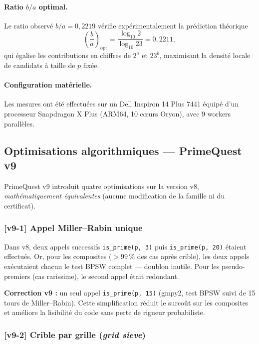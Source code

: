 \paragraph{Ratio $b/a$ optimal.}
Le ratio observé $b/a = 0{,}2219$ vérifie expérimentalement la prédiction théorique
\[
  \left(\frac{b}{a}\right)_{\!\text{opt}}
  = \frac{\log_{10} 2}{\log_{10} 23} = 0{,}2211,
\]
qui égalise les contributions en chiffres de $2^a$ et $23^b$, maximisant la densité
locale de candidats à taille de $p$ fixée.

\paragraph{Configuration matérielle.}
Les mesures ont été effectuées sur un Dell Inspiron 14 Plus 7441 équipé d'un
processeur Snapdragon X Plus (ARM64, 10 cœurs Oryon), avec 9 workers parallèles.

\subsection{Optimisations algorithmiques — PrimeQuest v9}
\label{subsec:v9_optimisations}

PrimeQuest v9 introduit quatre optimisations sur la version v8,
\emph{mathématiquement équivalentes} (aucune modification de la famille ni du certificat).

\subsubsection{[v9-1] Appel Miller--Rabin unique}

Dans v8, deux appels successifs \texttt{is\_prime(p,\,3)} puis \texttt{is\_prime(p,\,20)}
étaient effectués. Or, pour les composites ($> 99\,\%$ des cas après crible), les deux
appels exécutaient chacun le test BPSW complet — doublon inutile. Pour les pseudo-premiers
(cas rarissime), le second appel était redondant.

\textbf{Correction v9 :} un seul appel \texttt{is\_prime(p,\,15)} (gmpy2, test BPSW
suivi de 15 tours de Miller--Rabin). Cette simplification réduit le surcoût sur les
composites et améliore la lisibilité du code sans perte de rigueur probabiliste.

\subsubsection{[v9-2] Crible par grille (\emph{grid sieve})}

